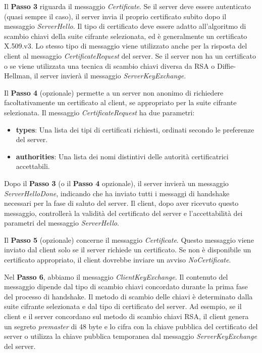 \documentclass{article}
\theoremstyle{definition}
\begin{document}
Il \textbf{Passo 3} riguarda il messaggio \textit{Certificate}. Se il server deve essere autenticato (quasi sempre il caso), il server invia il proprio certificato subito dopo il messaggio \textit{ServerHello}. Il tipo di certificato deve essere adatto all'algoritmo di scambio chiavi della suite cifrante selezionata, ed è generalmente un certificato X.509.v3. Lo stesso tipo di messaggio viene utilizzato anche per la risposta del client al messaggio \textit{CertificateRequest} del server. Se il server non ha un certificato o se viene utilizzata una tecnica di scambio chiavi diversa da RSA o Diffie-Hellman, il server invierà il messaggio \textit{ServerKeyExchange}.

Il \textbf{Passo 4} (opzionale) permette a un server non anonimo di richiedere facoltativamente un certificato al client, se appropriato per la suite cifrante selezionata. Il messaggio \textit{CertificateRequest} ha due parametri:
\begin{itemize}
    \item \textbf{types}: Una lista dei tipi di certificati richiesti, ordinati secondo le preferenze del server.
    \item \textbf{authorities}: Una lista dei nomi distintivi delle autorità certificatrici accettabili.
\end{itemize}

Dopo il \textbf{Passo 3} (o il \textbf{Passo 4} opzionale), il server invierà un messaggio \textit{ServerHelloDone}, indicando che ha inviato tutti i messaggi di handshake necessari per la fase di saluto del server. Il client, dopo aver ricevuto questo messaggio, controllerà la validità del certificato del server e l'accettabilità dei parametri del messaggio \textit{ServerHello}.

Il \textbf{Passo 5} (opzionale) concerne il messaggio \textit{Certificate}. Questo messaggio viene inviato dal client solo se il server richiede un certificato. Se non è disponibile un certificato appropriato, il client dovrebbe inviare un avviso \textit{NoCertificate}.

Nel \textbf{Passo 6}, abbiamo il messaggio \textit{ClientKeyExchange}. Il contenuto del messaggio dipende dal tipo di scambio chiavi concordato durante la prima fase del processo di handshake. Il metodo di scambio delle chiavi è determinato dalla suite cifrante selezionata e dal tipo di certificato del server. Ad esempio, se il client e il server concordano sul metodo di scambio chiavi RSA, il client genera un segreto \textit{premaster} di 48 byte e lo cifra con la chiave pubblica del certificato del server o utilizza la chiave pubblica temporanea dal messaggio \textit{ServerKeyExchange} del server.
\end{document}
